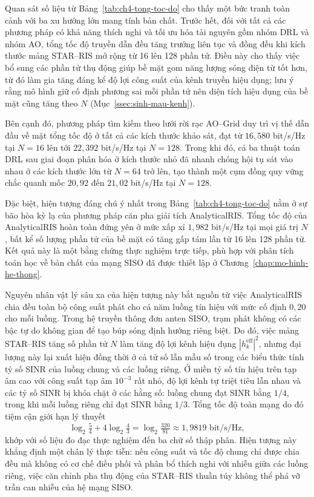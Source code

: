 

Quan sát số liệu từ Bảng~\ref{tab:ch4-tong-toc-do} cho thấy một bức tranh toàn cảnh với ba xu hướng lớn mang tính
bản chất. Trước hết, đối với tất cả các phương pháp có khả năng thích nghi và tối ưu hóa tài nguyên gồm nhóm DRL và
nhóm AO, tổng tốc độ truyền dẫn đều tăng trưởng liên tục và đồng đều khi kích thước mảng STAR--RIS mở rộng từ 16
lên 128 phần tử. Điều này cho thấy việc bổ sung các phần tử thụ động giúp bề mặt gom năng lượng sóng điện từ tốt
hơn, từ đó làm gia tăng đáng kể độ lợi công suất của kênh truyền hiệu dụng; lưu ý rằng mô hình giữ cố định phương
sai mỗi phần tử nên diện tích hiệu dụng của bề mặt cũng tăng theo $N$ (Mục~\ref{ssec:sinh-mau-kenh}).

Bên cạnh đó, phương pháp tìm kiếm theo lưới rời rạc AO--Grid duy trì vị thế dẫn đầu về mặt tổng tốc độ ở tất cả
các kích thước khảo sát, đạt từ $16,580$ bit/s/Hz tại $N = 16$ lên tới $22,392$ bit/s/Hz tại $N = 128$. Trong khi
đó, cả ba thuật toán DRL sau giai đoạn phân hóa ở kích thước nhỏ đã nhanh chóng hội tụ sát vào nhau ở các kích
thước lớn từ $N = 64$ trở lên, tạo thành một cụm đồng quy vững chắc quanh mốc $20,92$ đến $21,02$ bit/s/Hz tại
$N = 128$.

Đặc biệt, hiện tượng đáng chú ý nhất trong Bảng~\ref{tab:ch4-tong-toc-do} nằm ở sự bão hòa kỳ lạ của phương pháp
căn pha giải tích AnalyticalRIS. Tổng tốc độ của AnalyticalRIS hoàn toàn đứng yên ở mức xấp xỉ $1,982$ bit/s/Hz tại
mọi giá trị $N$, bất kể số lượng phần tử của bề mặt có tăng gấp tám lần từ 16 lên 128 phần tử. Kết quả này là một
bằng chứng thực nghiệm trực tiếp, phù hợp với phân tích toán học về bản chất của mạng SISO đã được thiết lập ở
Chương~\ref{chap:mo-hinh-he-thong}.

Nguyên nhân vật lý sâu xa của hiện tượng này bắt nguồn từ việc AnalyticalRIS chia đều toàn bộ công suất phát cho
cả năm luồng tín hiệu với mức cố định $0,20$ cho mỗi luồng. Trong hệ truyền thông đơn anten SISO, trạm phát không có
các bậc tự do không gian để tạo búp sóng định hướng riêng biệt. Do đó, việc mảng STAR--RIS tăng số phần tử $N$ làm
tăng độ lợi kênh hiệu dụng $|h^{\mathrm{eff}}_k|^2$, nhưng đại lượng này lại xuất hiện đồng thời ở cả tử số lẫn mẫu
số trong các biểu thức tính tỷ số SINR của luồng chung và các luồng riêng. Ở miền tỷ số tín hiệu trên tạp âm cao
với công suất tạp âm $10^{-3}$ rất nhỏ, độ lợi kênh tự triệt tiêu lẫn nhau và các tỷ số SINR bị khóa chặt ở các
hằng số: luồng chung đạt SINR bằng $1/4$, trong khi mỗi luồng riêng chỉ đạt SINR bằng $1/3$. Tổng tốc độ toàn mạng
do đó tiệm cận giới hạn lý thuyết
\[
\log_2\tfrac{5}{4} + 4\log_2\tfrac{4}{3} = \log_2\tfrac{320}{81} \approx 1,9819 \text{ bit/s/Hz},
\]
khớp với số liệu đo đạc thực nghiệm đến ba chữ số thập phân. Hiện tượng này khẳng định một chân lý thực tiễn: nếu
công suất và tốc độ chung chỉ được chia đều mà không có cơ chế điều phối và phân bổ thích nghi với nhiễu giữa các
luồng riêng, việc căn chỉnh pha thụ động của STAR--RIS thuần túy không thể phá vỡ trần can nhiễu của hệ mạng SISO.

